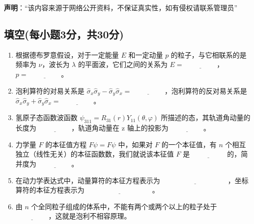 
\textbf{声明}：“该内容来源于网络公开资料，不保证真实性，如有侵权请联系管理员”

\subsection{填空(每小题3分，共30分)}
\begin{enumerate}
    \item 根据德布罗意假设，对于一定能量 $E$ 和一定动量 $p$ 的粒子，与它相联系的是频率为 $\nu$，波长为 $\lambda$ 的平面波，它们之间的关系为 $E = \underline{\hspace{2cm}}$，$p = \underline{\hspace{2cm}}$。
    
    \item 泡利算符的对易关系是 $\hat \sigma_x \hat \sigma_y - \hat \sigma_y \hat \sigma_x = \underline{\hspace{2cm}}$，泡利算符的反对易关系是 $\hat \sigma_x \hat \sigma_y + \hat \sigma_y \hat \sigma_x = \underline{\hspace{2cm}}$。
    
    \item 氢原子态函数波函数 $\psi_{311} = R_{31}(r) Y_{11}(\theta, \varphi)$ 所描述的态，其轨道角动量的长度为 $\underline{\hspace{2cm}}$，轨道角动量在 z 轴上的投影为 $\underline{\hspace{2cm}}$。
    
    \item 力学量 $F$ 的本征值方程 $F\psi = F\psi$ 中，如果对 $F$ 的一个本征值，有 $n$ 个相互独立（线性无关）的本征函数数，我们就说该本征值 $F$ 是 $\underline{\hspace{2cm}}$ 的，简并度为 $\underline{\hspace{2cm}}$。
    
    \item 在动力学表达式中，动量算符的本征方程表示为 $\underline{\hspace{4cm}}$，坐标算符的本征方程表示为 $\underline{\hspace{4cm}}$。
    
    \item 由 $n$ 个全同粒子组成的体系中，不能有两个或两个以上的粒子处于 $\underline{\hspace{2cm}}$，这就是泡利不相容原理。

\end{enumerate}